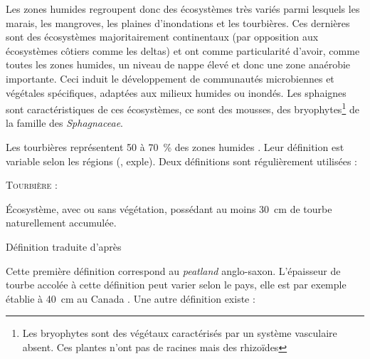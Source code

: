 Les zones humides regroupent donc des écosystèmes très variés parmi lesquels les marais, les mangroves, les plaines d'inondations et les tourbières.
Ces dernières sont des écosystèmes majoritairement continentaux (par opposition aux écosystèmes côtiers comme les deltas) et ont comme particularité d'avoir, comme toutes les zones humides, un niveau de nappe élevé et donc une zone anaérobie importante.
Ceci induit le développement de communautés microbiennes et végétales spécifiques, adaptées aux milieux humides ou inondés.
Les sphaignes sont caractéristiques de ces écosystèmes, ce sont des mousses, des bryophytes\footnote{Les bryophytes sont des végétaux caractérisés par un système vasculaire absent. Ces plantes n'ont pas de racines mais des rhizoïdes} de la famille des \textit{Sphagnaceae}.

Les tourbières représentent 50 à \SI{70}{\percent} des zones humides \cite{joosten2002}.
Leur définition est variable selon les régions (\plop, exple).
Deux définitions sont régulièrement utilisées :

\begin{pdef}
\textsc{Tourbière} :

Écosystème, avec ou sans végétation, possédant au moins \SI{30}{\cm} de tourbe naturellement accumulée.

\hfill {\scriptsize Définition traduite d'après \citet{joosten2002}}
\end{pdef}
Cette première définition correspond au \textit{peatland} anglo-saxon.
L'épaisseur de tourbe accolée à cette définition peut varier selon le pays, elle est par exemple établie à \SI{40}{\cm} au Canada \citep{nationalwetlandsworkinggroup1997}.
Une autre définition existe :

